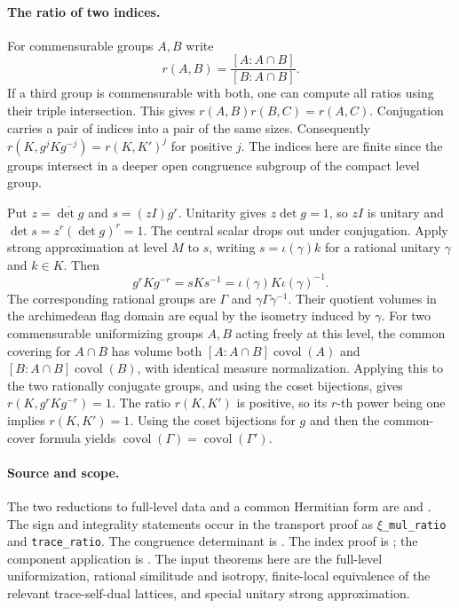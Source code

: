 \paragraph{The ratio of two indices.}
For commensurable groups \(A,B\) write
\[
 r(A,B)=\frac{[A:A\cap B]}{[B:A\cap B]} .
\]
If a third group is commensurable with both, one can compute all ratios
using their triple intersection. This gives \(r(A,B)r(B,C)=r(A,C)\).
Conjugation carries a pair of indices into a pair of the same sizes.
Consequently \(r(K,g^jKg^{-j})=r(K,K')^j\) for positive \(j\).
The indices here are finite since the groups intersect in a deeper open
congruence subgroup of the compact level group.

Put \(z=\overline{\det g}\) and \(s=(zI)g^r\).
Unitarity gives \(z\det g=1\), so \(zI\) is unitary and
\(\det s=z^r(\det g)^r=1\). The central scalar drops out under
conjugation. Apply strong approximation at level \(M\) to \(s\), writing
\(s=\iota(\gamma)k\) for a rational unitary \(\gamma\) and \(k\in K\).
Then
\[
 g^rKg^{-r}=sKs^{-1}=\iota(\gamma)K\iota(\gamma)^{-1}.
\]
The corresponding rational groups are \(\Gamma\) and
\(\gamma\Gamma\gamma^{-1}\). Their quotient volumes in the archimedean
flag domain are equal by the isometry induced by \(\gamma\).
For two commensurable uniformizing groups \(A,B\) acting freely at
this level, the common covering for \(A\cap B\) has volume both
\([A:A\cap B]\operatorname{covol}(A)\) and
\([B:A\cap B]\operatorname{covol}(B)\), with identical measure
normalization. Applying this to the two rationally conjugate groups,
and using the coset bijections, gives \(r(K,g^rKg^{-r})=1\).
The ratio \(r(K,K')\) is positive, so its \(r\)-th power being one
implies \(r(K,K')=1\). Using the coset bijections for \(g\) and then
the common-cover formula yields
\(\operatorname{covol}(\Gamma)=\operatorname{covol}(\Gamma')\).

\paragraph{Source and scope.}
The two reductions to full-level data and a common Hermitian form are
 and
.
The sign and integrality statements occur in the transport proof as
\(\xi\)\texttt{\_mul\_ratio} and \texttt{trace\_ratio}. The congruence determinant is
. The index proof is ;
the component application is .
The input theorems here are the full-level uniformization, rational
similitude and isotropy, finite-local equivalence of the relevant
trace-self-dual lattices, and special unitary strong approximation.
